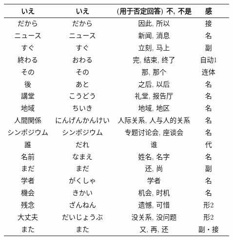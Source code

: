 \begin{longtable}{|c|c|c|c|c|}
いえ & いえ & (用于否定回答) 不, 不是 & 感 & \\ \hline
だから & だから & 因此, 所以 & 接 & \\ \hline
ニュース & ニュース & 新闻, 消息 & 名 & \\ \hline
すぐ & すぐ & 立刻, 马上 & 副 & \\ \hline
終わる & おわる & 完, 结束, 终了 & 自动1 & \\ \hline
その & その & 那, 那个 & 连体 & \\ \hline
後 & あと & 之后, 以后 & 名 & \\ \hline
講堂 & こうどう & 礼堂, 报告厅 & 名 & \\ \hline
地域 & ちいき & 地域, 地区 & 名 & \\ \hline
人間関係 & にんげんかんけい & 人际关系, 人与人的关系 & 名 & \\ \hline
シンポジウム & シンポジウム & 专题讨论会, 座谈会 & 名 & \\ \hline
誰 & だれ & 谁 & 代 & \\ \hline
名前 & なまえ & 姓名, 名字 & 名 & \\ \hline
まだ & まだ & 还, 尚 & 副 & \\ \hline
学者 & がくしゃ & 学者 & 名 & \\ \hline
機会 & きかい & 机会, 时机 & 名 & \\ \hline
残念 & ざんねん & 遗憾, 可惜 & 形2 & \\ \hline
大丈夫 & だいじょうぶ & 没关系, 没问题 & 形2 & \\ \hline
また & また & 又, 再, 还 & 副・接 & \\ \hline
\end{longtable}

